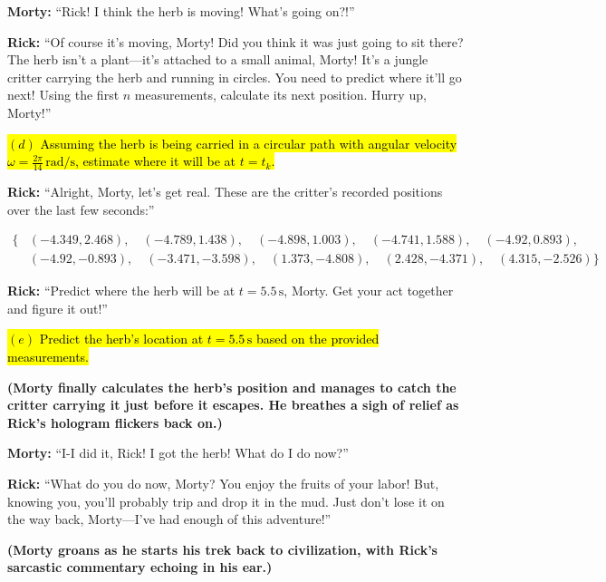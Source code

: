 \documentclass[a4paper, 12pt]{exam}
\begin{document}
\bigskip
\noindent \textbf{Morty:} “Rick! I think the herb is moving! What’s going on?!” \bigskip

\noindent \textbf{Rick:} “Of course it’s moving, Morty! Did you think it was just going to sit there? The herb isn’t a plant—it’s attached to a small animal, Morty! It’s a jungle critter carrying the herb and running in circles. You need to predict where it’ll go next! Using the first \(n\) measurements, calculate its next position. Hurry up, Morty!”

\bigskip

\hl{$(d)$ Assuming the herb is being carried in a circular path with angular velocity $\omega = \frac{2\pi}{14} \, \mathrm{rad/s}$, estimate where it will be at $t = t_k$.}

\bigskip
\noindent \textbf{Rick:} “Alright, Morty, let’s get real. These are the critter’s recorded positions over the last few seconds:”

\[
\begin{aligned}
\{
&(-4.349, 2.468), \quad (-4.789, 1.438), \quad (-4.898, 1.003), \quad (-4.741, 1.588), \quad (-4.92, 0.893), \\
&(-4.92, -0.893), \quad (-3.471, -3.598), \quad (1.373, -4.808), \quad (2.428, -4.371), \quad (4.315, -2.526)
\}
\end{aligned}
\]

\noindent \textbf{Rick:} “Predict where the herb will be at \(t = 5.5 \, \mathrm{s}\), Morty. Get your act together and figure it out!”

\bigskip

\hl{$(e)$ Predict the herb's location at $t = 5.5 \, \mathrm{s}$ based on the provided measurements.}
\bigskip

\noindent \textbf{(Morty finally calculates the herb’s position and manages to catch the critter carrying it just before it escapes. He breathes a sigh of relief as Rick’s hologram flickers back on.)}

\bigskip
\noindent \textbf{Morty:} “I-I did it, Rick! I got the herb! What do I do now?” \bigskip

\noindent \textbf{Rick:} “What do you do now, Morty? You enjoy the fruits of your labor! But, knowing you, you’ll probably trip and drop it in the mud. Just don’t lose it on the way back, Morty—I’ve had enough of this adventure!”

\bigskip

\noindent \textbf{(Morty groans as he starts his trek back to civilization, with Rick’s sarcastic commentary echoing in his ear.)}
\end{document}

